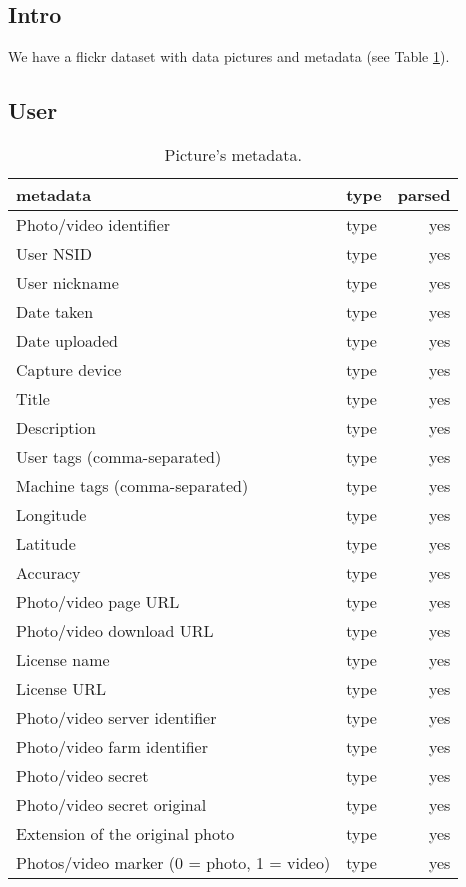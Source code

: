 \documentclass[11pt]{article}
\begin{document}
\subsection*{Intro}
We have a flickr dataset with data pictures and metadata (see Table \ref{table:metadata}).

\subsection*{User}


\begin{table}
\centering
	\begin{tabular}{llr}
	\toprule
    \cmidrule(r){1-2}
    	metadata & type & parsed \\
    \midrule
    	Photo/video identifier & type & yes\\
		User NSID & type & yes\\
		User nickname & type & yes\\
		Date taken & type & yes\\
		Date uploaded & type & yes\\
		Capture device & type & yes\\
		Title & type & yes\\
		Description & type & yes\\
		User tags (comma-separated) & type & yes\\
		Machine tags (comma-separated) & type & yes\\
		Longitude & type & yes\\
		Latitude & type & yes\\
		Accuracy & type & yes\\
		Photo/video page URL & type & yes\\
		Photo/video download URL & type & yes\\
		License name & type & yes\\
		License URL & type & yes\\
		Photo/video server identifier & type & yes\\
		Photo/video farm identifier & type & yes\\
		Photo/video secret & type & yes\\
		Photo/video secret original & type & yes\\
		Extension of the original photo & type & yes\\
		Photos/video marker (0 = photo, 1 = video) & type & yes\\
    \bottomrule
	\end{tabular}
\caption{Picture's metadata.}
\label{table:metadata}
\end{table}
\end{document}
